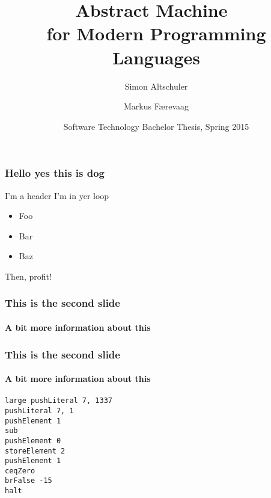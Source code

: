 \documentclass{beamer}
\title{Abstract Machine~\\for Modern Programming Languages}
\author[Altschuler, Færevaag]{Simon Altschuler \and Markus Færevaag}
\date{Software Technology Bachelor Thesis, Spring 2015}
\begin{document}
\frame{\titlepage}

\begin{frame}
  \frametitle{Hello yes this is dog}

  \begin{block}{I'm a header}
    I'm in yer loop
  \end{block}

  \begin{itemize}
  \item Foo
  \item Bar
  \item Baz
  \end{itemize}

  Then, profit!

\end{frame}

\begin{frame}
  \frametitle{This is the second slide}
  \framesubtitle{A bit more information about this}


\end{frame}

\begin{frame}[fragile]
  \frametitle{This is the second slide}
  \framesubtitle{A bit more information about this}

  \begin{lstlisting}[basicstyle=\small]
large pushLiteral 7, 1337
pushLiteral 7, 1
pushElement 1
sub
pushElement 0
storeElement 2
pushElement 1
ceqZero
brFalse -15
halt
  \end{lstlisting}

\end{frame}
\end{document}

